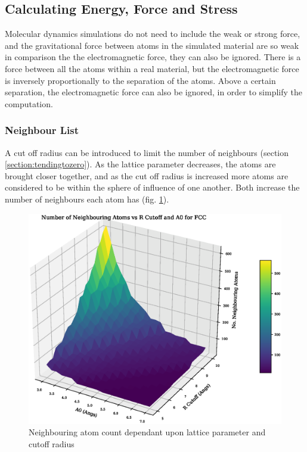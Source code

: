 \FloatBarrier
\subsection{Calculating Energy, Force and Stress}
\label{section:backgroundenergyforcestress}

Molecular dynamics simulations do not need to include the weak or strong force, and the gravitational force between atoms in the simulated material are so weak in comparison the the electromagnetic force, they can also be ignored.  There is a force between all the atoms within a real material, but the electromagnetic force is inversely proportionally to the separation of the atoms.  Above a certain separation, the electromagnetic force can also be ignored, in order to simplify the computation.

\FloatBarrier
\subsubsection{Neighbour List}
\label{section:neighbourlist}

A cut off radius can be introduced to limit the number of neighbours (section \ref{section:tendingtozero}).  As the lattice parameter decreases, the atoms are brought closer together, and as the cut off radius is increased more atoms are considered to be within the sphere of influence of one another.  Both increase the number of neighbours each atom has (fig. \ref{fig:nlsize}).

\begin{figure}[tbp]
  \begin{center}
    \includegraphics[scale=0.40]{chapters/interatomic_potential_fitting/plots/atom_neighbours.eps}
    \caption{Neighbouring atom count dependant upon lattice parameter and cutoff radius}
    \label{fig:nlsize}
  \end{center}
\end{figure}

